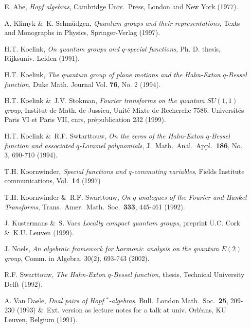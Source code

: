 

\begin{thebibliography}{99}
\small

 {\sc E. Abe},
   {\em Hopf algebras\/},
   Cambridge Univ.\ Press, London and New York (1977).

 {\sc A. Klimyk \&\ K. Schm\"udgen},
   {\em Quantum groups and their representations\/},
   Texts and Monographs in Physics, Springer-Verlag (1997).

 {\sc H.T. Koelink},
   {\em On quantum groups and $q$-special functions\/},
   Ph. D. thesis, Rijksuniv. Leiden (1991).

 {\sc H.T. Koelink},
   {\em The quantum group of plane motions and the Hahn-Exton $q$-Bessel function\/},
        Duke Math. Journal Vol. {\bf 76}, No. 2 (1994).

 {\sc H.T. Koelink \&\ J.V. Stokman},
   {\em Fourier transforms on the quantum $SU(1,1)$ group\/},
    Institut de Math. de Jussieu, Unit\'e Mixte de Recherche 7586,
    Universit\'es Paris VI et Paris VII, {\sc cnrs},
    pr\'epublication 232 (1999).

 {\sc H.T. Koelink \&\ R.F. Swtarttouw},
  {\em On the zeros of the Hahn-Exton $q$-Bessel function and associated $q$-Lommel
  polynomials\/}, J.\ Math.\ Anal.\ Appl.\ {\bf 186}, No. 3, 690-710 (1994).

 {\sc T.H. Koornwinder},
  {\em Special functions and $q$-commuting variables\/},
  Fields Institute communications, Vol.\ {\bf 14} (1997)

 {\sc T.H. Koornwinder \&\ R.F. Swarttouw},
  {\em On $q$-analogues of the Fourier and Hankel Transforms\/},
  Trans.\ Amer.\ Math.\ Soc.\ {\bf 333}, 445-461 (1992).

 {\sc J. Kustermans \&\ S. Vaes}
  {\em Locally compact quantum groups\/},
  preprint U.C. Cork \&\ K.U. Leuven (1999).

 {\sc J. Noels},
   {\em An algebraic framework for harmonic analysis
        on the quantum $E(2)$ group\/},
   Comm. in Algebra, 30(2), 693-743 (2002).

 {\sc R.F. Swarttouw},
  {\em The Hahn-Exton $q$-Bessel function\/},
  thesis, Technical University Delft (1992).

 {\sc A. Van Daele},
   {\em Dual pairs of Hopf $^*$-algebras\/},
   Bull.\ London Math.\ Soc.\ {\bf 25}, 209-230 (1993)
   \&\ Ext. version as lecture notes for a talk at
   univ. Orl\'eans, KU Leuven, Belgium (1991).


\end{thebibliography}
